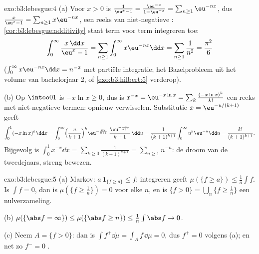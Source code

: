 \begin{solution}{exo:b3:lebesgue:4}
(a) Voor $x > 0$ is $\frac1{\eu^x - 1} = \frac{\eu^{-x}}{1 -
\eu^{-x}} = \sum_{n\geq1}\eu^{-nx}$, dus $\frac{x}{\eu^x - 1} =
\sum_{n\geq1}x\eu^{-nx}$, een reeks van niet-negatieve : \cref{cor:b3:lebesgue:additivity} staat term voor term
integreren toe:
\[
\int_0^\infty\frac{x\,\dd x}{\eu^x - 1}
= \sum_{n\geq1}\int_0^\infty x\eu^{-nx}\dd x
= \sum_{n\geq1}\frac1{n^2} = \frac{\pi^2}6
\]
($\int_0^\infty x\eu^{-nx}\dd x = n^{-2}$ met partiële
integratie; het Bazelprobleem uit het volume van bachelorjaar 2,
of \cref{exo:b3:hilbert:5} verderop).

(b) Op $\intoo01$ is $-x\ln x \geq 0$, dus is $x^{-x} = \eu^{-x\ln
x} = \sum_k\frac{(-x\ln x)^k}{k!}$ een reeks met niet-negatieve
termen: opnieuw verwisselen. Substitutie $x = \eu^{-u/(k+1)}$
geeft
\[
\int_0^1(-x\ln x)^k\dd x
= \int_0^\infty\Bigl(\frac{u}{k+1}\Bigr)^{k}
\eu^{-\frac{ku}{k+1}}\;\frac{\eu^{-\frac u{k+1}}}{k+1}\,\dd u
= \frac{1}{(k+1)^{k+1}}\int_0^\infty u^k\eu^{-u}\dd u
= \frac{k!}{(k+1)^{k+1}} .
\]
Bijgevolg is $\int_0^1x^{-x}\dd x = \sum_{k\geq0}\frac{1}{(k+1)
^{k+1}} = \sum_{n\geq1}n^{-n}$: de droom van de tweedejaars,
streng bewezen.
\end{solution}

\begin{solution}{exo:b3:lebesgue:5}
(a) Markov: $a\,\mathbf 1_{\{f \geq a\}} \leq f$; integreren geeft
$\mu(\{f \geq a\}) \leq \frac1a\int f$. Is $\int f = 0$, dan is
$\mu(\{f \geq \frac1n\}) = 0$ voor elke $n$, en is $\{f > 0\} =
\bigcup_n\{f \geq \frac1n\}$ een nulverzameling.

(b) $\mu(\{\abs f = \infty\}) \leq \mu(\{\abs f \geq n\}) \leq
\frac1n\int\abs f \to 0$.

(c) Neem $A = \{f > 0\}$: dan is $\int f^+\dd\mu = \int_Af\,\dd\mu
= 0$, dus $f^+ = 0$  volgens (a); en net zo $f^- = 0$
.
\end{solution}


